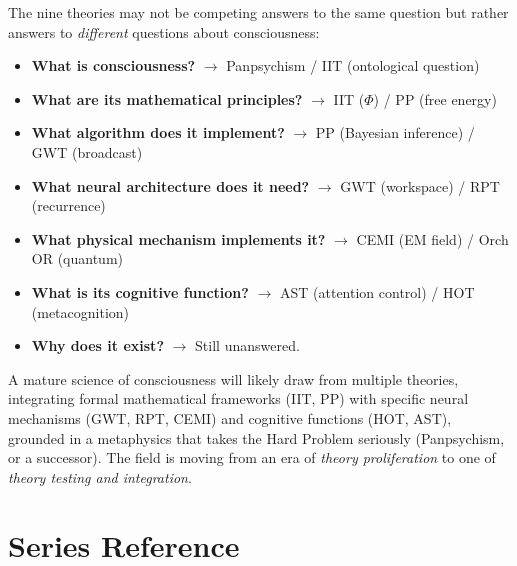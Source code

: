 \documentclass[11pt,a4paper]{report}
\begin{document}
\begin{synthbox}
The nine theories may not be competing answers to the same question but rather answers to \emph{different} questions about consciousness:
\begin{itemize}[leftmargin=1.5em]
  \item \textbf{What is consciousness?} $\to$ Panpsychism / IIT (ontological question)
  \item \textbf{What are its mathematical principles?} $\to$ IIT ($\Phi$) / PP (free energy)
  \item \textbf{What algorithm does it implement?} $\to$ PP (Bayesian inference) / GWT (broadcast)
  \item \textbf{What neural architecture does it need?} $\to$ GWT (workspace) / RPT (recurrence)
  \item \textbf{What physical mechanism implements it?} $\to$ CEMI (EM field) / Orch OR (quantum)
  \item \textbf{What is its cognitive function?} $\to$ AST (attention control) / HOT (metacognition)
  \item \textbf{Why does it exist?} $\to$ Still unanswered.
\end{itemize}

A mature science of consciousness will likely draw from multiple theories, integrating formal mathematical frameworks (IIT, PP) with specific neural mechanisms (GWT, RPT, CEMI) and cognitive functions (HOT, AST), grounded in a metaphysics that takes the Hard Problem seriously (Panpsychism, or a successor). The field is moving from an era of \emph{theory proliferation} to one of \emph{theory testing and integration}.
\end{synthbox}


\chapter{Series Reference}
\end{document}
